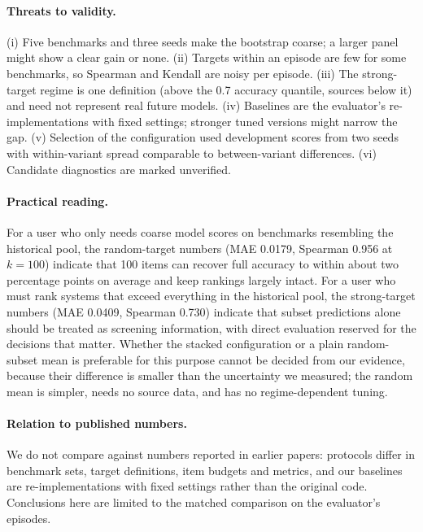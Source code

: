 \documentclass{article}
\begin{document}
\paragraph{Threats to validity.} (i) Five benchmarks and three seeds make the bootstrap coarse; a larger panel might show a clear gain or none. (ii) Targets within an episode are few for some benchmarks, so Spearman and Kendall are noisy per episode. (iii) The strong-target regime is one definition (above the 0.7 accuracy quantile, sources below it) and need not represent real future models. (iv) Baselines are the evaluator's re-implementations with fixed settings; stronger tuned versions might narrow the gap. (v) Selection of the configuration used development scores from two seeds with within-variant spread comparable to between-variant differences. (vi) Candidate diagnostics are marked unverified.

\paragraph{Practical reading.} For a user who only needs coarse model scores on benchmarks resembling the historical pool, the random-target numbers (MAE 0.0179, Spearman 0.956 at $k=100$) indicate that 100 items can recover full accuracy to within about two percentage points on average and keep rankings largely intact. %
For a user who must rank systems that exceed everything in the historical pool, the strong-target numbers (MAE 0.0409, Spearman 0.730) indicate that subset predictions alone should be treated as screening information, with direct evaluation reserved for the decisions that matter. Whether the stacked configuration or a plain random-subset mean is preferable for this purpose cannot be decided from our evidence, because their difference is smaller than the uncertainty we measured; the random mean is simpler, needs no source data, and has no regime-dependent tuning.

\paragraph{Relation to published numbers.} We do not compare against numbers reported in earlier papers: protocols differ in benchmark sets, target definitions, item budgets and metrics, and our baselines are re-implementations with fixed settings rather than the original code. Conclusions here are limited to the matched comparison on the evaluator's episodes.
\end{document}
